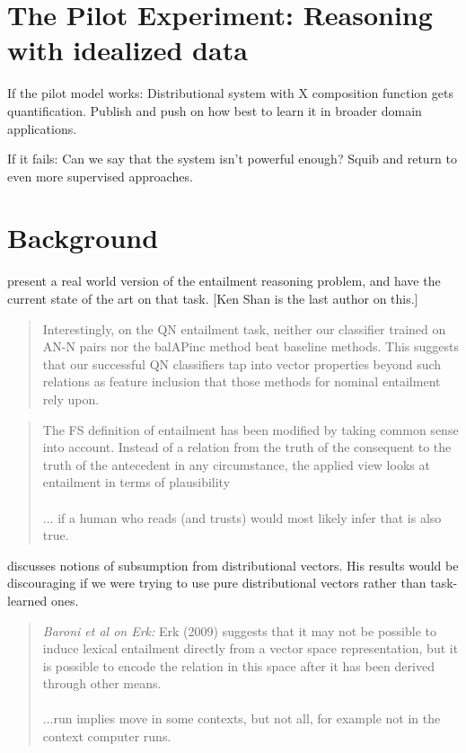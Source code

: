 \documentclass[12pt,leqno,tbtags,twoside]{article}
\theoremstyle{dotless}
\begin{document}
\section{The Pilot Experiment: Reasoning with idealized data}

If the pilot model works: Distributional system with X composition function gets quantification. Publish and push on how best to learn it in broader domain applications.

If it fails: Can we say that the system isn't powerful enough? Squib and return to even more supervised approaches.

\section{Background}

\citet{baroni2012entailment} present a real world version of the entailment reasoning problem, and have the current state of the art on that task. [Ken Shan is the last author on this.]

\begin{quote}
Interestingly, on the QN entailment task, neither our classifier trained on AN-N pairs nor the balAPinc method beat baseline methods. This suggests that our successful QN classifiers tap into vector properties beyond such relations as feature inclusion that those methods for nominal entailment rely upon.
\end{quote}

\begin{quote}
The FS definition of entailment has been modified
by taking common sense into account. Instead of
a relation from the truth of the consequent to the
truth of the antecedent in any circumstance, the
applied view looks at entailment in terms of plausibility \\\\... if a human who reads (and trusts) would most likely infer that is also true.
\end{quote}

\citet{erk2009representing} discusses notions of subsumption from distributional vectors. His results would be discouraging if we were trying to use pure distributional vectors rather than task-learned ones.

\begin{quote}
\textit{Baroni et al on Erk:} Erk (2009) suggests that it
may not be possible to induce lexical entailment
directly from a vector space representation, but it
is possible to encode the relation in this space after it has been derived through other means.\\\\
...run implies move in some contexts, but not all, for example not in the context computer runs.
\end{quote}
\end{document}
